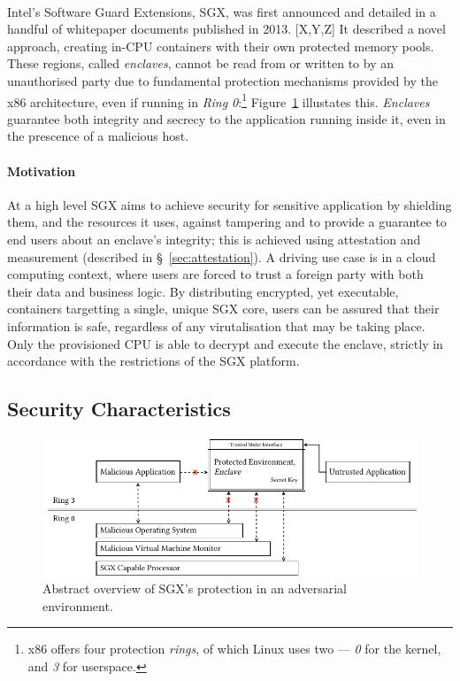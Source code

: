 \paragraph{} Intel's Software Guard Extensions, SGX, was first announced and detailed in a handful of whitepaper documents published in 2013. [X,Y,Z] It described a novel approach, creating in-CPU containers with their own protected memory pools. These regions, called \textit{enclaves}, cannot be read from or written to by an unauthorised party due to fundamental protection mechanisms provided by the x86 architecture, even if running in \textit{Ring 0}:\footnote{x86 offers four protection \textit{rings}, of which Linux uses two --- \textit{0} for the kernel, and \textit{3} for userspace.} Figure~\ref{fig:sgx-basic} illustates this. \textit{Enclaves} guarantee both integrity and secrecy to the application running inside it, even in the prescence of a malicious host.

\paragraph{Motivation} At a high level SGX aims to achieve security for sensitive application by shielding them, and the resources it uses, against tampering and to provide a guarantee to end users about an enclave's integrity; this is achieved using attestation and measurement (described in §~\ref{sec:attestation}). A driving use case is in a cloud computing context, where users are forced to trust a foreign party with both their data and business logic. By distributing encrypted, yet executable, containers targetting a single, unique SGX core, users can be assured that their information is safe, regardless of any virutalisation that may be taking place. Only the provisioned CPU is able to decrypt and execute the enclave, strictly in accordance with the restrictions of the SGX platform.

\subsection{Security Characteristics}

\begin{figure}[]
    \centering
    \includegraphics[width=0.95\linewidth]{figures/SGX-architecture.pdf}
    \caption{Abstract overview of SGX's protection in an adversarial environment.}
    \label{fig:sgx-basic}
\end{figure}

